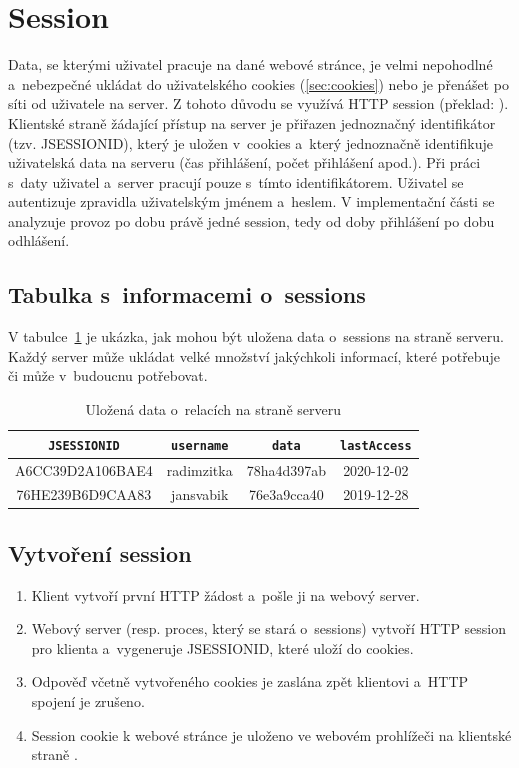 \section{Session}
\label{sec:session}
Data, se kterými uživatel pracuje na dané webové stránce, je velmi nepohodlné a~nebezpečné ukládat do uživatelského cookies (\ref{sec:cookies}) nebo je přenášet po síti od uživatele na server. Z tohoto důvodu se využívá HTTP session (překlad: ). Klientské straně žádající přístup na server je přiřazen jednoznačný identifikátor (tzv. JSESSIONID), který je uložen v~cookies a~který jednoznačně identifikuje uživatelská data na serveru (čas přihlášení, počet přihlášení apod.). Při práci s~daty uživatel a~server pracují pouze s~tímto identifikátorem. Uživatel se autentizuje zpravidla uživatelským jménem a~heslem. V implementační části se analyzuje provoz po dobu právě jedné session, tedy od doby přihlášení po dobu odhlášení.

\subsection*{Tabulka s~informacemi o~sessions}
V tabulce~\ref{tab:session_cookie} je ukázka, jak mohou být uložena data o~sessions na straně serveru. Každý server může ukládat velké množství jakýchkoli informací, které potřebuje či může v~budoucnu potřebovat.

\begin{table}[H]
\centering
\label{tab:session_cookie}
\begin{tabular}{|c|c|c|c|}
\hline
\texttt{JSESSIONID} & \texttt{username} & \texttt{data} & \texttt{lastAccess} \\ \hline
A6CC39D2A106BAE4 & radimzitka & 78ha4d397ab & 2020-12-02 \\ \hline
76HE239B6D9CAA83& jansvabik & 76e3a9cca40 & 2019-12-28 \\ \hline
\end{tabular}
\caption{Uložená data o~relacích na straně serveru}
\end{table}

\subsection*{Vytvoření session}
\begin{enumerate}
  \item Klient vytvoří první HTTP žádost a~pošle ji na webový server.
  \item Webový server (resp. proces, který se stará o~sessions) vytvoří HTTP session pro klienta a~vygeneruje JSESSIONID, které uloží do cookies.
  \item Odpověď včetně vytvořeného cookies je zaslána zpět klientovi a~HTTP spojení je zrušeno.
  \item Session cookie k webové stránce je uloženo ve webovém prohlížeči na klientské straně \cite{bib:session_creating}.
\end{enumerate}


